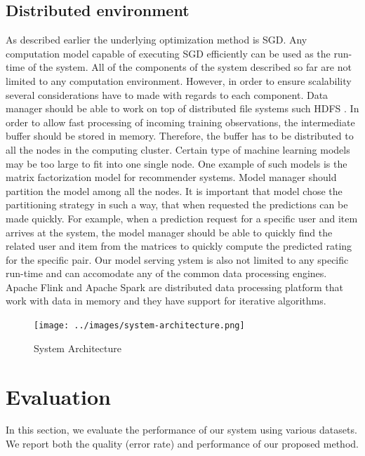 \documentclass{sig-alternate-05-2015}
\begin{document}
\subsection{Distributed environment} 
As described earlier the underlying optimization method is SGD.
Any computation model capable of executing SGD efficiently can be used as the run-time of the system.
All of the components of the system described so far are not limited to any computation environment.
However, in order to ensure scalability several considerations have to made with regards to each component.
Data manager should be able to work on top of distributed file systems such HDFS \cite{shvachko2010hadoop}. 
In order to allow fast processing of incoming training observations, the intermediate buffer should be stored in memory.
Therefore, the buffer has to be distributed to all the nodes in the computing cluster.
Certain type of machine learning models may be too large to fit into one single node.
One example of such models is the matrix factorization model for recommender systems.
Model manager should partition the model among all the nodes.
It is important that model chose the partitioning strategy in such a way, that when requested the predictions can be made quickly.
For example, when a prediction request for a specific user and item arrives at the system, the model manager should be able to quickly find the related user and item from the matrices to quickly compute the predicted rating for the specific pair.
Our model serving ystem is also not limited to any specific run-time and can accomodate any of the common data processing engines.
Apache Flink \cite{carbone2015apache, alexandrov2014stratosphere} and Apache Spark \cite{zaharia2010spark} are distributed data processing platform that work with data in memory and they have support for iterative algorithms.

\begin{figure}[t]
\centering
\texttt{[image: ../images/system-architecture.png]}
\caption{System Architecture}
\label{fig:system-architecture}
\end{figure}

\section{Evaluation} \label{evaluation} 
In this section, we evaluate the performance of our system using various datasets. 
We report both the quality (error rate) and performance of our proposed method. 
\end{document}
